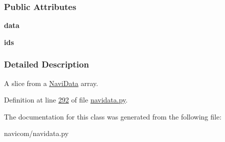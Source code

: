 \subsubsection*{Public Attributes}
\begin{DoxyCompactItemize}
\item 
\hypertarget{classnavicom_1_1navidata_1_1NaviSlice_a21ac86b9fbcb4ffc952782983690af5f}{
{\bfseries data}}
\label{classnavicom_1_1navidata_1_1NaviSlice_a21ac86b9fbcb4ffc952782983690af5f}

\item 
\hypertarget{classnavicom_1_1navidata_1_1NaviSlice_abc8769a0168ce54ee35624363deb0bcd}{
{\bfseries ids}}
\label{classnavicom_1_1navidata_1_1NaviSlice_abc8769a0168ce54ee35624363deb0bcd}

\end{DoxyCompactItemize}


\subsubsection{Detailed Description}
A slice from a \hyperlink{classnavicom_1_1navidata_1_1NaviData}{NaviData} array. 

Definition at line \hyperlink{navidata_8py_source_l00292}{292} of file \hyperlink{navidata_8py_source}{navidata.py}.



The documentation for this class was generated from the following file:\begin{DoxyCompactItemize}
\item 
navicom/navidata.py\end{DoxyCompactItemize}
